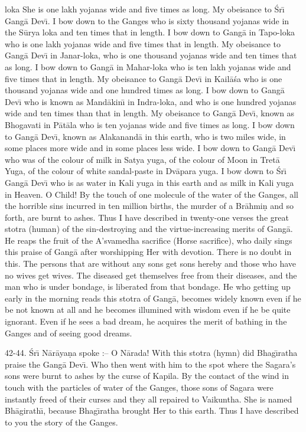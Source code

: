 loka She is one lakh yojanas wide and five times as long. My obeisance to \'Sr\={\i} Gang\=a Dev\={\i}. I bow down to the Ganges who is sixty thousand yojanas wide in the S\=urya loka and ten times that in length. I bow down to Gang\=a in Tapo-loka who is one lakh yojanas wide and five times that in length. My obeisance to Gang\=a Dev\={\i} in Janar-loka, who is one thousand yojanas wide and ten times that as long. I bow down to Gang\=a in Mahar-loka who is ten lakh yojanas wide and five times that in length. My obeisance to Gang\=a Dev\={\i} in Kail\=a\'sa who is one thousand yojanas wide and one hundred times as long. I bow down to Gang\=a Dev\={\i} who is known as Mand\=akin\={\i} in Indra-loka, and who is one hundred yojanas wide and ten times than that in length. My obeisance to Gang\=a Dev\={\i}, known as Bhogavati in P\=at\=ala who is ten yojanas wide and five times as long. I bow down to Gang\=a Dev\={\i}, known as Alakanand\=a in this earth, who is two miles wide, in some places more wide and in some places less wide. I bow down to Gang\=a Dev\={\i} who was of the colour of milk in Satya yuga, of the colour of Moon in Tret\=a Yuga, of the colour of white sandal-paste in Dv\=apara yuga. I bow down to \'Sr\={\i} Gang\=a Dev\={\i} who is as water in Kali yuga in this earth and as milk in Kali yuga in Heaven. O Child! By the touch of one molecule of the water of the Ganges, all the horrible sins incurred in ten million births, the murder of a Br\=ahmi\d{n} and so forth, are burnt to ashes. Thus I have described in twenty-one verses the great stotra (human) of the sin-destroying and the virtue-increasing merits of Gang\=a. He reaps the fruit of the A'svamedha sacrifice (Horse sacrifice), who daily sings this praise of Gang\=a after worshipping Her with devotion. There is no doubt in this. The persons that are without any sons get sons hereby and those who have no wives get wives. The diseased get themselves free from their diseases, and the man who is under bondage, is liberated from that bondage. He who getting up early in the morning reads this stotra of Gang\=a, becomes widely known even if he be not known at all and he becomes illumined with wisdom even if he be quite ignorant. Even if he sees a bad dream, he acquires the merit of bathing in the Ganges and of seeing good dreams.

42-44. \'Sr\={\i} N\=ar\=aya\d{n}a spoke :-- O N\=arada! With this stotra (hymn) did Bhag\={\i}ratha praise the Gang\=a Dev\={\i}. Who then went with him to the spot where the Sagara's sons were burnt to ashes by the curse of Kapila. By the contact of the wind in touch with the particles of water of the Ganges, those sons of Sagara were instantly freed of their curses and they all repaired to Vaikuntha. She is named Bh\=agirath\={\i}, because Bhag\={\i}ratha brought Her to this earth. Thus I have described to you the story of the Ganges.

